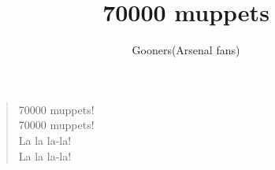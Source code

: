\documentclass[a4paper,12pt]{article}
\title{70000 muppets}
\author{Gooners(Arsenal fans)}
\date{}
\begin{document}
	
	\maketitle
	
	\begin{verse}
		
		70000 muppets! \\
		70000 muppets! \\
		La la la-la! \\
		La la la-la!
		
	\end{verse}
	
\end{document}
